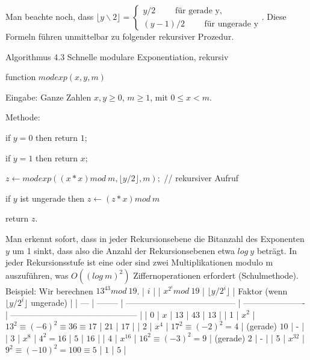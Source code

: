 \documentclass[a4paper]{article}
\begin{document}
\begin{multicols}{3}
    Man beachte noch, dass $\lfloor y\backslash 2\rfloor=\begin{cases} y/2\quad\quad\text{ für gerade y},\\ (y-1)/2\quad\quad\text{ für ungerade y}\end{cases}$. Diese Formeln führen unmittelbar zu folgender rekursiver Prozedur.

    Algorithmus 4.3 Schnelle modulare Exponentiation, rekursiv
    \begin{itemize*}
        \item function $modexp(x,y,m)$
        \item Eingabe: Ganze Zahlen $x,y\geq 0$, $m\geq 1$, mit $0\leq x < m$.
        \item Methode:
        \item if $y= 0$ then return $1$;
        \item if $y= 1$ then return $x$;
        \item $z\leftarrow modexp((x*x) mod\ m,\lfloor y/2\rfloor,m);$ // rekursiver Aufruf
        \item if $y$ ist ungerade then $z\leftarrow (z*x) mod\ m$
        \item return $z$.
    \end{itemize*}

    Man erkennt sofort, dass in jeder Rekursionsebene die Bitanzahl des Exponenten $y$ um 1 sinkt, dass also die Anzahl der Rekursionsebenen etwa $log\ y$ beträgt. In jeder Rekursionsstufe ist eine oder sind zwei Multiplikationen modulo m auszuführen, was $O((log\ m)^2)$ Ziffernoperationen erfordert (Schulmethode).
    Beispiel: Wir berechnen $13^{43} mod\ 19$.
    | $i$ |          | $x^{2^i} mod\ 19$                       | $\lfloor y/2^i\rfloor$ | Faktor (wenn $\lfloor y/2^i\rfloor$ ungerade) |
    | --- | -------- | --------------------------------------- | ---------------------- | --------------------------------------------- |
    | 0   | $x$      | $13$                                    | $43$                   | $13$                                          |
    | 1   | $x^2$    | $13^2 \equiv (-6)^2 \equiv 36\equiv 17$ | $21$                   | $17$                                          |
    | 2   | $x^4$    | $17^2 \equiv (-2)^2 = 4$                | (gerade) $10$          | -                                             |
    | 3   | $x^8$    | $4^2 = 16$                              | $5$                    | $16$                                          |
    | 4   | $x^{16}$ | $16^2 \equiv (-3)^2 = 9$                | (gerade) $2$           | -                                             |
    | 5   | $x^{32}$ | $9^2 \equiv (-10)^2 = 100\equiv 5$      | $1$                    | $5$                                           |


\end{multicols}
\end{document}
